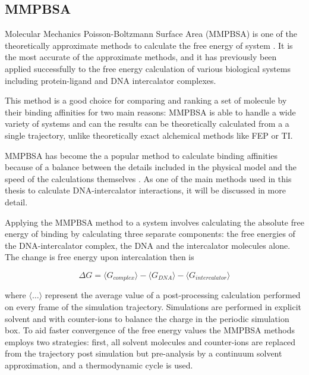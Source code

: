 \subsection{MMPBSA}

Molecular Mechanics Poisson-Boltzmann Surface Area (MMPBSA) is one of the theoretically approximate methods to calculate the free energy of system \cite{gilson2007calculation, steinbrecher2010towards}. It is the most accurate of the approximate methods, and it has previously been applied successfully to the free energy calculation of various biological systems including protein-ligand and DNA intercalator complexes.

This method is a good choice for comparing and ranking a set of molecule by their binding affinities for two main reasons: MMPBSA is able to handle a wide variety of systems and can the results can be theoretically calculated from a a single trajectory, unlike theoretically exact alchemical methods like FEP or TI. 

MMPBSA has become the a popular method to calculate binding affinities because of a balance between the details included in the physical model and the speed of the calculations themselves \cite{kollman2000calculating, sitkoff1994accurate}. As one of the main methods used in this thesis to calculate DNA-intercalator interactions, it will be discussed in more detail.

Applying the MMPBSA method to a system involves calculating the absolute free energy of binding by calculating three separate components: the free energies of the DNA-intercalator complex, the DNA and the intercalator molecules alone. The change is free energy upon intercalation then is

\begin{equation}
  \Delta G = \langle G_{complex} \rangle - \langle G_{DNA} \rangle - \langle G_{intercalator} \rangle
\end{equation}
\label{eq:mmpbsa}

where $\langle \dots \rangle$ represent the average value of a post-processing calculation performed on every frame of the simulation trajectory. Simulations are performed in explicit solvent and with counter-ions to balance the charge in the periodic simulation box.
To aid faster convergence of the free energy values the MMPBSA methods employs two strategies: first, all solvent molecules and counter-ions are replaced from the trajectory post simulation but pre-analysis by a continuum solvent approximation, and a thermodynamic cycle is used.

